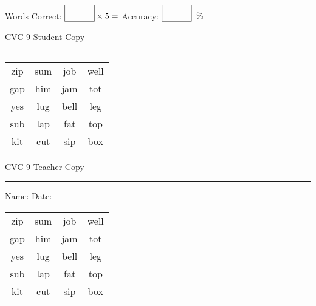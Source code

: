 \documentclass{memoir}
\begin{document}
\normalsize

Words Correct: $\fbox{\phantom{\huge 100}} \times 5 = $ Accuracy: $\fbox{\phantom{\huge 100}}\;\; \%$ 

\vfill

\newpage


\footnotesize \noindent
CVC 9 \hfill Student Copy
\smallskip
\hrule

\huge

\setlength{\tabcolsep}{14pt}
\def\arraystretch{2}

{\selectfont


\begin{vplace}[0.5]
\begin{center}
\begin{tabular}{cccc}
zip & sum & job & well \\
gap & him & jam & tot \\
yes & lug & bell & leg \\
sub & lap & fat & top \\
kit & cut & sip & box \\
\end{tabular}
\end{center}
\end{vplace}

}

\newpage

\footnotesize \noindent
CVC 9 \hfill Teacher Copy
\smallskip
\hrule

\normalsize

\vfill

\noindent
Name: \underline{\hspace{1.75in}} \hfill Date: \underline{\hspace{1in}}

\huge

{\selectfont


\begin{vplace}[0.5]
\begin{center}
\begin{tabular}{cccc}
zip & sum & job & well \\
gap & him & jam & tot \\
yes & lug & bell & leg \\
sub & lap & fat & top \\
kit & cut & sip & box \\
\end{tabular}
\end{center}
\end{vplace}



}
\end{document}
